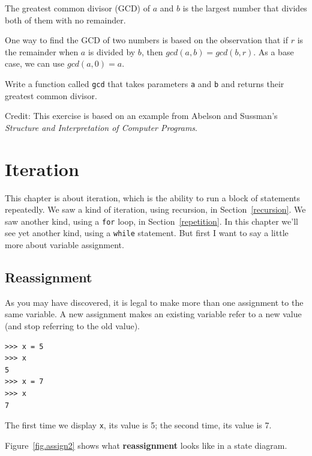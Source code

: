 \documentclass[10pt]{book}
\begin{document}
\begin{exercise}

The greatest common divisor (GCD) of $a$ and $b$ is the largest number
that divides both of them with no remainder.  

One way to find the GCD of two numbers is based on the observation
that if $r$ is the remainder when $a$ is divided by $b$, then $gcd(a,
b) = gcd(b, r)$.  As a base case, we can use $gcd(a, 0) = a$.

Write a function called
\verb"gcd" that takes parameters {\tt a} and {\tt b}
and returns their greatest common divisor.

Credit: This exercise is based on an example from Abelson and
Sussman's {\em Structure and Interpretation of Computer Programs}.

\end{exercise}


\chapter{Iteration}

This chapter is about iteration, which is the ability to run
a block of statements repeatedly.  We saw a kind of iteration,
using recursion, in Section~\ref{recursion}.
We saw another kind, using a {\tt for} loop,
in Section~\ref{repetition}.  In this chapter we'll see yet another
kind, using a {\tt while} statement.
But first I want to say a little more about variable assignment.


\section{Reassignment}

As you may have discovered, it is legal to make more than one
assignment to the same variable.  A new assignment makes an existing
variable refer to a new value (and stop referring to the old value).

\begin{verbatim}
>>> x = 5
>>> x
5
>>> x = 7
>>> x
7
\end{verbatim}
%
The first time we display 
{\tt x}, its value is 5; the second time, its
value is 7.

Figure~\ref{fig.assign2} shows what {\bf reassignment} looks
like in a state diagram.  
\end{document}
